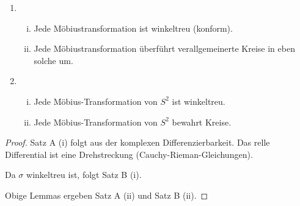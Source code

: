 \begin{st}
	\begin{enumerate}[A:]
		\item
			\begin{enumerate}[(i)]
				\item
					Jede Möbiustransformation ist winkeltreu (konform).
				\item
					Jede Möbiustransformation überführt verallgemeinerte Kreise in eben solche um.
			\end{enumerate}
		\item
			\begin{enumerate}[(i)]
				\item
					Jede Möbius-Transformation von $S^2$ ist winkeltreu.
				\item
					Jede Möbius-Transformation von $S^2$ bewahrt Kreise.
			\end{enumerate}
	\end{enumerate}
	\begin{proof}
		Satz A (i) folgt aus der komplexen Differenzierbarkeit.
		Das relle Differential ist eine Drehstreckung (Cauchy-Rieman-Gleichungen).

		Da $\sigma$ winkeltreu ist, folgt Satz B (i).

		Obige Lemmas ergeben Satz A (ii) und Satz B (ii).
	\end{proof}
\end{st}



